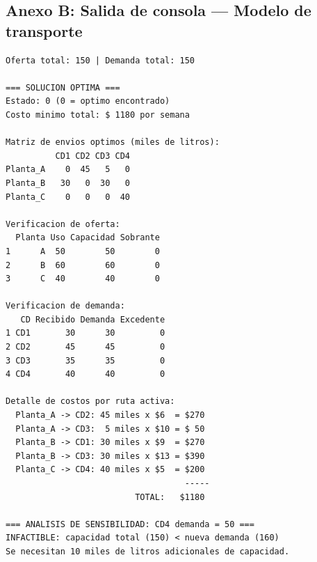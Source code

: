 \documentclass[12pt,a4paper]{article}
\begin{document}
\subsection*{Anexo B: Salida de consola --- Modelo de transporte}

\begin{lstlisting}[language={}, basicstyle=\ttfamily\footnotesize,
                   frame=single, backgroundcolor=\color{black!5}]
Oferta total: 150 | Demanda total: 150

=== SOLUCION OPTIMA ===
Estado: 0 (0 = optimo encontrado)
Costo minimo total: $ 1180 por semana

Matriz de envios optimos (miles de litros):
          CD1 CD2 CD3 CD4
Planta_A    0  45   5   0
Planta_B   30   0  30   0
Planta_C    0   0   0  40

Verificacion de oferta:
  Planta Uso Capacidad Sobrante
1      A  50        50        0
2      B  60        60        0
3      C  40        40        0

Verificacion de demanda:
   CD Recibido Demanda Excedente
1 CD1       30      30         0
2 CD2       45      45         0
3 CD3       35      35         0
4 CD4       40      40         0

Detalle de costos por ruta activa:
  Planta_A -> CD2: 45 miles x $6  = $270
  Planta_A -> CD3:  5 miles x $10 = $ 50
  Planta_B -> CD1: 30 miles x $9  = $270
  Planta_B -> CD3: 30 miles x $13 = $390
  Planta_C -> CD4: 40 miles x $5  = $200
                                    -----
                          TOTAL:   $1180

=== ANALISIS DE SENSIBILIDAD: CD4 demanda = 50 ===
INFACTIBLE: capacidad total (150) < nueva demanda (160)
Se necesitan 10 miles de litros adicionales de capacidad.
\end{lstlisting}
\end{document}
